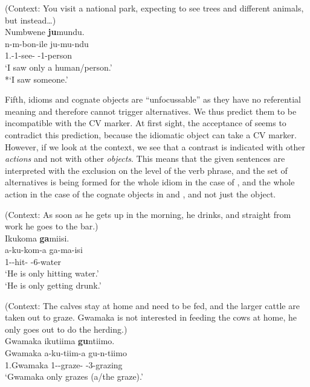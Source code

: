 \documentclass[output=paper]{langscibook}
\begin{document}
\ea
(Context: You visit a national park, expecting to see trees and different animals, but instead…)\\
Numbwene \textbf{ju}mundu.\\
\gll
n-m-bon-ile  ju-mu-ndu\\
1\SG.\SM{}-1\OM{}-see-\PFV{}  \EXH{}-1-person\\
\glt
‘I saw only a human/person.’\\
*`I saw someone.’ \citep[338]{vanderWalLusekelo2022}


\z


Fifth, idioms and cognate objects are “unfocussable” as they have no referential meaning and therefore cannot trigger alternatives. We thus predict them to be incompatible with the CV marker. At first sight, the acceptance of  seems to contradict this prediction, because the idiomatic object can take a CV marker. However, if we look at the context, we see that a contrast is indicated with other \textit{actions} and not with other \textit{objects}. This means that the given sentences are interpreted with the exclusion on the level of the verb phrase, and the set of alternatives is being formed for the whole idiom in the case of , and the whole action in the case of the cognate objects in  and , and not just the object.\largerpage

\ea
\label{bkm:Ref114666832}
(Context: As soon as he gets up in the morning, he drinks, and straight from work he goes to the bar.\label{bkm:Ref56944486})\\
Ikukoma \textbf{ga}miisi.\\
\gll
a-ku-kom-a  ga-ma-isi\\
1\SM{}-\PRS{}-hit-\FV{}  \EXH{}-6-water\\
\glt
‘He is only hitting water.’\\
‘He is only getting drunk.’ \citep[338]{vanderWalLusekelo2022}


\z


\ea
\label{bkm:Ref114666844}
(Context: The calves stay at home and need to be fed, and the larger cattle are taken out to graze. Gwamaka is not interested in feeding the cows at home, he only goes out to do the herding.)\\
Gwamaka ikutiima \textbf{gu}ntiimo.\\
\gll
Gwamaka  a-ku-tiim-a  gu-n-tiimo\\
1.Gwamaka  1\SM{}-\PRS{}-graze-\FV{}  \EXH{}-3-grazing\\
\glt
‘Gwamaka only grazes (a/the graze).’ \citep[338]{vanderWalLusekelo2022}\\
\end{document}
